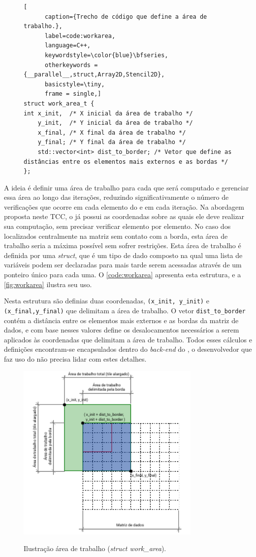 \begin{figure}
  \begin{lstlisting}[
      caption={Trecho de código que define a área de trabalho.}, 
      label=code:workarea,
      language=C++,
      keywordstyle=\color{blue}\bfseries,
      otherkeywords = {__parallel__,struct,Array2D,Stencil2D}, 
      basicstyle=\tiny, 
      frame = single,]
struct work_area_t {
int x_init,  /* X inicial da área de trabalho */
    y_init,  /* Y inicial da área de trabalho */
    x_final, /* X final da área de trabalho */
    y_final; /* Y final da área de trabalho */
    std::vector<int> dist_to_border; /* Vetor que define as distâncias entre os elementos mais externos e as bordas */
};
  \end{lstlisting}
\end{figure}

A ideia é definir uma área de trabalho para cada \tile que será computado e gerenciar essa área ao longo das iterações, reduzindo significativamente o número de verificações que ocorre em cada elemento do \tile e em cada iteração. Na abordagem proposta neste TCC, o \cluster já possui as coordenadas sobre as quais ele deve realizar sua computação, sem precisar verificar elemento por elemento. No caso dos \tiles localizados centralmente na matriz sem contato com a borda, esta área de trabalho seria a máxima possível sem sofrer restrições.
Esta área de trabalho é definida por uma \textit{struct}, que é um tipo de dado composto na qual uma lista de variáveis podem ser declaradas para mais tarde serem acessadas através de um ponteiro único para cada uma. O \autoref{code:workarea} apresenta esta estrutura, e a \autoref{fig:workarea} ilustra seu uso.

Nesta estrutura são definias duas coordenadas, \texttt{(x\_init, y\_init)} e \texttt{(x\_final,y\_final)} que delimitam a área de trabalho. O vetor \texttt{dist\_to\_border} contém a distância entre os elementos mais externos e as bordas da matriz de dados, e com base nesses valores define os desalocamentos necessários a serem aplicados às coordenadas que delimitam a área de trabalho. Todos esses cálculos e definições encontram-se encapsulados dentro do \textit{back-end} do \pskelmppa \async, o desenvolvedor que faz uso do \fw não precisa lidar com estes detalhes. 

\begin{figure}
  \centering
  \caption{Ilustração área de trabalho (\textit{struct work\_area}).}
  \includegraphics[width=0.8\textwidth]{figs/work_area.pdf}
  \label{fig:workarea}
\end{figure}

